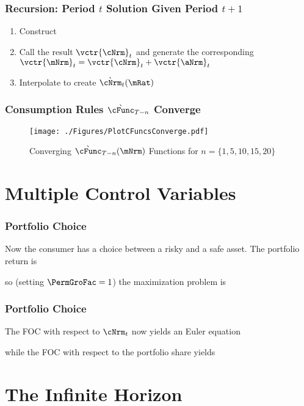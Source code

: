 \documentclass{beamer}
\begin{document}
\begin{frame}%
\frametitle{Recursion: Period $t$ Solution Given Period $t+1$}
\begin{enumerate}
\item Construct 

\item Call the result $\vctr{\cNrm}_{t}$ and generate the corresponding $\vctr{\mNrm}_{t}=\vctr{\cNrm}_{t}+\vctr{\aNrm}_{t}$
\item Interpolate to create $\grave{\cNrm}_{t}(\mRat)$
\end{enumerate}

\end{frame}

\begin{frame}%
\frametitle{Consumption Rules $\grave{\cFunc}_{T-n}$ Converge}

\begin{figure}
        \texttt{[image: ./Figures/PlotCFuncsConverge.pdf]}
        \caption{Converging $\grave{\cFunc}_{T-n}(\mNrm)$ Functions for $n=\{1,5,10,15,20\}$}
        \label{fig:PlotCFuncsConverge}
\end{figure}

\end{frame}


\section{Multiple Control Variables}
\begin{frame}
\frametitle{Portfolio Choice}

Now the consumer has a choice between a risky and a safe asset.  \pause The portfolio
return is

\pause so (setting $\PermGroFac=1$) the maximization problem is \pause 


\end{frame}

\begin{frame}
\frametitle{Portfolio Choice}

The FOC with respect to $\cNrm_{t}$ now yields an Euler equation

\pause
while the FOC with respect to the portfolio share yields


\end{frame}

\section{The Infinite Horizon}
\end{document}
